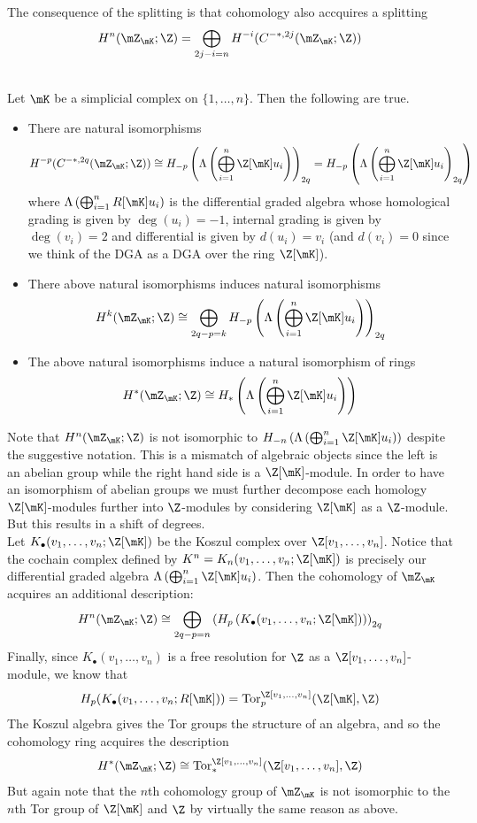 \documentclass[a4paper]{article}
\begin{document}
The consequence of the splitting is that cohomology also accquires a splitting $$H^n(\mZ_\mK;\Z)=\bigoplus_{2j-i=n}H^{-i}(C^{-\ast,2j}(\mZ_\mK;\Z))$$

\begin{prp}{}{}\\
Let $\mK$ be a simplicial complex on $\{1,\dots,n\}$. Then the following are true. 
\begin{itemize}
\item There are natural isomorphisms $$H^{-p}(C^{-\ast,2q}(\mZ_\mK;\Z))\cong H_{-p}\left(\Lambda\left(\bigoplus_{i=1}^n\Z[\mK]u_i\right)\right)_{2q}=H_{-p}\left(\Lambda\left(\bigoplus_{i=1}^n\Z[\mK]u_i\right)_{2q}\right)$$ where $\Lambda\left(\bigoplus_{i=1}^nR[\mK]u_i\right)$ is the differential graded algebra whose homological grading is given by $\deg(u_i)=-1$, internal grading is given by $\deg(v_i)=2$ and differential is given by $d(u_i)=v_i$ (and $d(v_i)=0$ since we think of the DGA as a DGA over the ring $\Z[\mK]$). 
\item There above natural isomorphisms induces natural isomorphisms $$H^k(\mZ_\mK;\Z)\cong\bigoplus_{2q-p=k}H_{-p}\left(\Lambda\left(\bigoplus_{i=1}^n\Z[\mK]u_i\right)\right)_{2q}$$
\item The above natural isomorphisms induce a natural isomorphism of rings $$H^\ast(\mZ_\mK;\Z)\cong H_\ast\left(\Lambda\left(\bigoplus_{i=1}^n\Z[\mK]u_i\right)\right)$$
\end{itemize}
\end{prp}

Note that $H^n(\mZ_\mK;\Z)$ is not isomorphic to $H_{-n}\left(\Lambda\left(\bigoplus_{i=1}^n\Z[\mK]u_i\right)\right)$ despite the suggestive notation. This is a mismatch of algebraic objects since the left is an abelian group while the right hand side is a $\Z[\mK]$-module. In order to have an isomorphism of abelian groups we must further decompose each homology $\Z[\mK]$-modules further into $\Z$-modules by considering $\Z[\mK]$ as a $\Z$-module. But this results in a shift of degrees. \\

Let $K_\bullet(v_1,\dots,v_n;\Z[\mK])$ be the Koszul complex over $\Z[v_1,\dots,v_n]$. Notice that the cochain complex defined by $K^n=K_n(v_1,\dots,v_n;\Z[\mK])$ is precisely our differential graded algebra $\Lambda\left(\bigoplus_{i=1}^n\Z[\mK]u_i\right)$. Then the cohomology of $\mZ_\mK$ acquires an additional description: $$H^n(\mZ_\mK;\Z)\cong\bigoplus_{2q-p=n}\left(H_p\left(K_\bullet(v_1,\dots,v_n;\Z[\mK])\right)\right)_{2q}$$ Finally, since $K_\bullet(v_1,\dots,v_n)$ is a free resolution for $\Z$ as a $\Z[v_1,\dots,v_n]$-module, we know that $$H_p(K_\bullet(v_1,\dots,v_n;R[\mK]))=\text{Tor}_p^{\Z[v_1,\dots,v_n]}(\Z[\mK],\Z)$$ The Koszul algebra gives the Tor groups the structure of an algebra, and so the cohomology ring acquires the description $$H^\ast(\mZ_\mK;\Z)\cong\text{Tor}_\ast^{\Z[v_1,\dots,v_n]}(\Z[v_1,\dots,v_n],\Z)$$ But again note that the $n$th cohomology group of $\mZ_\mK$ is not isomorphic to the $n$th Tor group of $\Z[\mK]$ and $\Z$ by virtually the same reason as above. 
\end{document}
